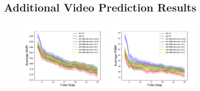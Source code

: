 \documentclass{article}
\begin{document}
\subsection{Additional Video Prediction Results}

\begin{figure}
  \centering
  \includegraphics[width=0.4\textwidth]{images/bair_ae_comparison_ssim.pdf}
  \includegraphics[width=0.4\textwidth]{images/bair_ae_comparison_psnr.pdf}
  \caption{}
  \label{bair}
\end{figure}


%




%
%
\end{document}
